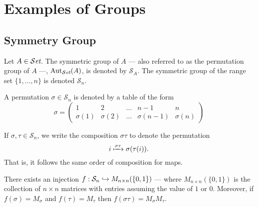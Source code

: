 \section{Examples of Groups}

\subsection{Symmetry Group}

\begin{definition}\label{def: sym-group}
  Let \(A \in {\mathcal{S}\textit{et}}\). The symmetric group of \(A\) --- also referred to as the
  permutation group of \(A\) ---, \(\operatorname{Aut}_{\mathcal{S}\textit{et}}(A)\), is denoted by \(\mathcal
  S_A\). The symmetric group of the range set \(\{1, \dots, n\}\) is denoted
  \(\mathcal S_n\).
\end{definition}

\begin{notation}[Permutations]
  A permutation \(\sigma \in \mathcal S_n\) is denoted by a table of the form
  \[
    \sigma =
    \begin{pmatrix}
      1 &2 &\dots &n-1 &n \\
      \sigma(1) &\sigma(2) &\dots &\sigma(n-1) &\sigma(n)
    \end{pmatrix}
  \]
\end{notation}

\begin{remark}[Convention]\label{rem: convention-perm}
  If \(\sigma, \tau \in \mathcal S_n\), we write the composition \(\sigma \tau\)
  to denote the permutation
  \[
    i \xmapsto{\sigma\tau} \sigma(\tau(i)).
  \]
  That is, it follows the same order of composition for maps.
\end{remark}

\begin{proposition}
  There exists an injection \(f: \mathcal S_n \hookrightarrow M_{n \times n}(\{0, 1\})\)
  --- where \(M_{n \times n}(\{0, 1\})\) is the collection of \(n \times n\)
  matrices with entries assuming the value of \(1\) or \(0\). Moreover, if
  \(f(\sigma) = M_\sigma\) and \(f(\tau) = M_\tau\) then \(f(\sigma \tau) =
  M_\sigma M_\tau\).
\end{proposition}

